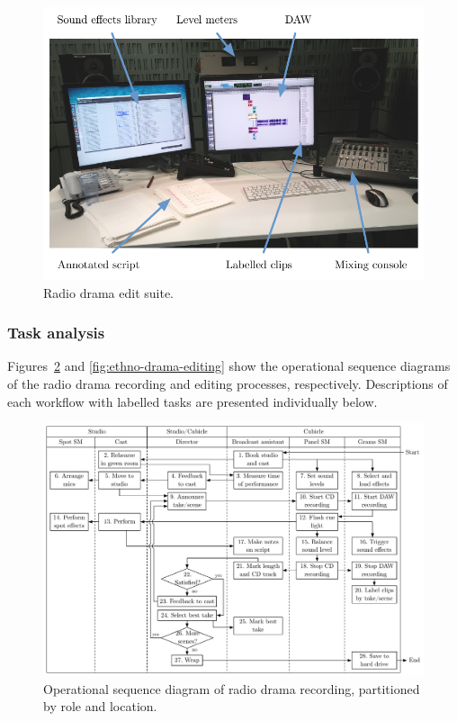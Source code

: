 \begin{figure}
  \centering
  \includegraphics[width=\columnwidth]{figs/drama-edit-labelled.pdf}
  \caption{Radio drama edit suite.}
  \label{fig:drama-edit}
\end{figure}

\subsubsection{Task analysis}
Figures~\ref{fig:ethno-drama-recording} and \ref{fig:ethno-drama-editing} show the operational sequence diagrams of the
radio drama recording and editing processes, respectively. Descriptions of each workflow with labelled tasks are
presented individually below.

\begin{figure}
  \centering
  \includegraphics[angle=90,width=\columnwidth]{figs/drama-recording-workflow.pdf}
  \caption{Operational sequence diagram of radio drama recording, partitioned by role and location.}
  \label{fig:ethno-drama-recording}
\end{figure}

